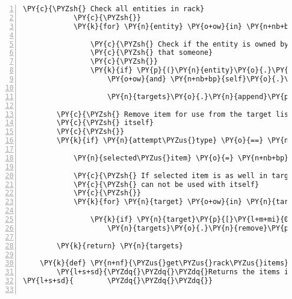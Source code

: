 \begin{Verbatim}[commandchars=\\\{\},numbers=left,firstnumber=1,stepnumber=1]
            \PY{c}{\PYZsh{} Check all entities in rack}
            \PY{c}{\PYZsh{}}
            \PY{k}{for} \PY{n}{entity} \PY{o+ow}{in} \PY{n+nb+bp}{self}\PY{o}{.}\PY{n}{host}\PY{o}{.}\PY{n}{rack}\PY{o}{.}\PY{n}{entity\PYZus{}dict}\PY{o}{.}\PY{n}{values}\PY{p}{(}\PY{p}{)}\PY{p}{:}

                \PY{c}{\PYZsh{} Check if the entity is owned by someone and if the client is}
                \PY{c}{\PYZsh{} that someone}
                \PY{c}{\PYZsh{}}
                \PY{k}{if} \PY{p}{(}\PY{n}{entity}\PY{o}{.}\PY{n}{identifier} \PY{o+ow}{in} \PY{n+nb+bp}{self}\PY{o}{.}\PY{n}{host}\PY{o}{.}\PY{n}{rack}\PY{o}{.}\PY{n}{owner\PYZus{}dict}\PY{o}{.}\PY{n}{keys}\PY{p}{(}\PY{p}{)}
                    \PY{o+ow}{and} \PY{n+nb+bp}{self}\PY{o}{.}\PY{n}{host}\PY{o}{.}\PY{n}{rack}\PY{o}{.}\PY{n}{owner\PYZus{}dict}\PY{p}{[}\PY{n}{entity}\PY{o}{.}\PY{n}{identifier}\PY{p}{]} \PY{o+ow}{is} \PY{n+nb+bp}{self}\PY{o}{.}\PY{n}{host}\PY{o}{.}\PY{n}{client\PYZus{}id}\PY{p}{)}\PY{p}{:}

                    \PY{n}{targets}\PY{o}{.}\PY{n}{append}\PY{p}{(}\PY{p}{(}\PY{n}{entity}\PY{p}{,} \PY{n}{entity}\PY{o}{.}\PY{n}{identifier}\PY{p}{)}\PY{p}{)}

        \PY{c}{\PYZsh{} Remove item for use from the target list to prevent using it with}
        \PY{c}{\PYZsh{} itself}
        \PY{c}{\PYZsh{}}
        \PY{k}{if} \PY{n}{attempt\PYZus{}type} \PY{o}{==} \PY{n+nb+bp}{self}\PY{o}{.}\PY{n}{ATTEMPT\PYZus{}USE}\PY{p}{:}

            \PY{n}{selected\PYZus{}item} \PY{o}{=} \PY{n+nb+bp}{self}\PY{o}{.}\PY{n}{select\PYZus{}item\PYZus{}menu}\PY{o}{.}\PY{n}{list}\PY{p}{[}\PY{n+nb+bp}{self}\PY{o}{.}\PY{n}{select\PYZus{}item\PYZus{}menu}\PY{o}{.}\PY{n}{list\PYZus{}index}\PY{p}{]}\PY{p}{[}\PY{l+m+mi}{0}\PY{p}{]}

            \PY{c}{\PYZsh{} If selected item is as well in target list remove it because an item}
            \PY{c}{\PYZsh{} can not be used with itself}
            \PY{c}{\PYZsh{}}
            \PY{k}{for} \PY{n}{target} \PY{o+ow}{in} \PY{n}{targets}\PY{p}{:}

                \PY{k}{if} \PY{n}{target}\PY{p}{[}\PY{l+m+mi}{0}\PY{p}{]} \PY{o+ow}{is} \PY{n}{selected\PYZus{}item}\PY{p}{:}
                    \PY{n}{targets}\PY{o}{.}\PY{n}{remove}\PY{p}{(}\PY{n}{target}\PY{p}{)}

        \PY{k}{return} \PY{n}{targets}

    \PY{k}{def} \PY{n+nf}{\PYZus{}get\PYZus{}rack\PYZus{}items}\PY{p}{(}\PY{n+nb+bp}{self}\PY{p}{)}\PY{p}{:}
        \PY{l+s+sd}{\PYZdq{}\PYZdq{}\PYZdq{}Returns the items in the rack (inventory).}
\PY{l+s+sd}{        \PYZdq{}\PYZdq{}\PYZdq{}}


\end{Verbatim}
